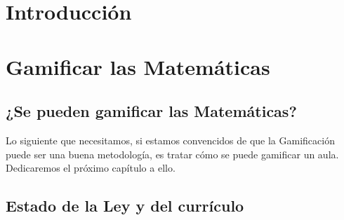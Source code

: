 \documentclass[a4paper, 12pt]{book}
\renewcommand{\BOthers}[1]{et al.\hbox{}}%
\renewcommand{\BOthers}[1]{et al.\hbox{}}%
\renewcommand{\BOthers}[1]{et al.\hbox{}}%
\renewcommand{\BOthers}[1]{et al.\hbox{}}%
\begin{document}
\renewcommand{\BOthers}[1]{et al.\hbox{}}
\renewcommand{\BAvailFrom}[1]{Recuperado de\hbox{}}
\renewcommand{\BRetrievedFrom}[1]{Recuperado de }
\renewcommand{\BRetrieved}[1]{}
\renewcommand{\bibname}{Bibliografía}






\cleardoublepage
\pagestyle{fancy}
\chapter{Introducción}








\cleardoublepage
\chapter{Gamificar las Matemáticas}

\section{¿Se pueden gamificar las Matemáticas?}

Lo siguiente que necesitamos, si estamos convencidos de que la Gamificación puede ser una buena metodología, es tratar cómo se puede gamificar un aula.
%
Dedicaremos el próximo capítulo a ello.

\section{Estado de la Ley y del currículo}
\end{document}
